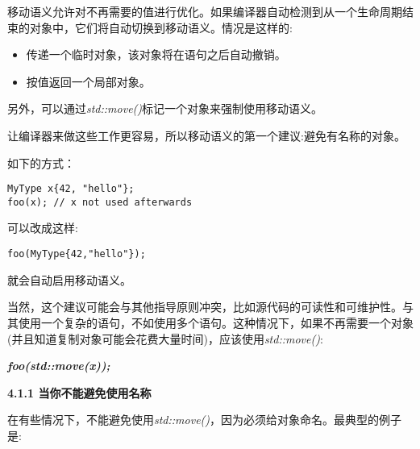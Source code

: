 移动语义允许对不再需要的值进行优化。如果编译器自动检测到从一个生命周期结束的对象中，它们将自动切换到移动语义。情况是这样的:\par

\begin{itemize}
	\item 传递一个临时对象，该对象将在语句之后自动撤销。
	\item 按值返回一个局部对象。
\end{itemize}

另外，可以通过\textit{std::move()}标记一个对象来强制使用移动语义。\par

让编译器来做这些工作更容易，所以移动语义的第一个建议:避免有名称的对象。\par

如下的方式：\par

\begin{lstlisting}[caption={}]
MyType x{42, "hello"};
foo(x); // x not used afterwards
\end{lstlisting}

可以改成这样:\par

\begin{lstlisting}[caption={}]
foo(MyType{42,"hello"});
\end{lstlisting}

就会自动启用移动语义。\par

当然，这个建议可能会与其他指导原则冲突，比如源代码的可读性和可维护性。与其使用一个复杂的语句，不如使用多个语句。这种情况下，如果不再需要一个对象(并且知道复制对象可能会花费大量时间)，应该使用\textit{std::move()}:\par

\textit{\textbf{foo(std::move(x));}}\par

\hspace*{\fill} \par %
\textbf{4.1.1 当你不能避免使用名称}

在有些情况下，不能避免使用\textit{std::move()}，因为必须给对象命名。最典型的例子是:\par

